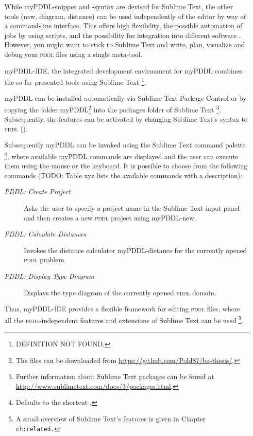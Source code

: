 \documentclass[a4paper,12pt]{report}
\newcommand{\mypddl}{\smallerft[0.8]{myPDDL}\xspace}
\newcommand{\pddl}{\textsc{pddl}\xspace}
\newcommand\smallerft[2][0.85]{{\scalefont{#1}#2}}
\begin{document}
While \mypddl-snippet and -syntax are devised for Sublime Text, the
other tools (new, diagram, distance) can be used independently of the
editor by way of a command-line interface. This offers high
flexibility, the possible automation of jobs by using scripts, and the
possibility for integration into different software
\cite{dix2009human}. However, you might want to stick to Sublime Text
and write, plan, visualize and debug your \pddl files using a single
meta-tool.

\mypddl-IDE, the integrated development environment for \mypddl
combines the so far presented tools using Sublime Text \footnote{DEFINITION NOT FOUND.}.

\mypddl can be installed automatically via Sublime Text Package
Control \cite{stpackage} or by copying the folder \mypddl \footnote{The files can be downloaded from \url{https://github.com/Pold87/ba-thesis/}.} into
the packages folder of Sublime Text \footnote{Further information about Sublime Text packages can be found at
\url{http://www.sublimetext.com/docs/3/packages.html}.}. Subsequently, the features
can be activated by changing Sublime Text's syntax to \pddl
().

Subsequently \mypddl can be invoked using the Sublime Text command
palette \footnote{Defaults to the shortcut .}, where available \mypddl commands are displayed and
the user can execute them using the mouse or the keyboard. It is
possible to choose from the following commands (TODO: Table xyz lists
the available commands with a description):

\begin{description}
\item[{\emph{PDDL: Create Project}}] Asks the user to specify a project name in
the Sublime Text input panel and then creates a new \pddl project
using \mypddl-new.
\item[{\emph{PDDL: Calculate Distances}}] Invokes the distance calculator
\mypddl-distance for the currently opened \pddl problem.
\item[{\emph{PDDL: Display Type Diagram}}] Displays the type diagram of the
currently opened \pddl domain.
\end{description}

Thus, \mypddl-IDE provides a flexible framework for editing \pddl
files, where all the \pddl-independent features and extensions of
Sublime Text can be used \footnote{A small overview of Sublime Text's features is given in
Chapter \texttt{ch:related.}}.
\end{document}
